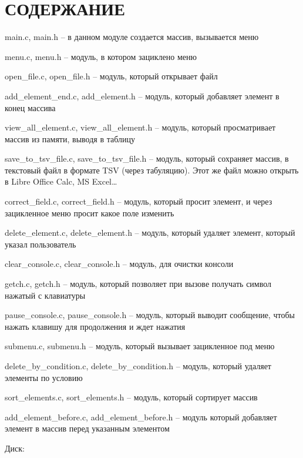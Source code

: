 \section*{СОДЕРЖАНИЕ}

main.c, main.h – в данном модуле создается массив, вызывается меню

menu.c, menu.h – модуль, в котором зациклено меню

open\_file.c, open\_file.h – модуль, который открывает файл

add\_element\_end.c, add\_element.h – модуль, который добавляет элемент в конец массива 

view\_all\_element.c, view\_all\_element.h – модуль, который просматривает массив из памяти, выводя в таблицу

save\_to\_tsv\_file.c, save\_to\_tsv\_file.h – модуль, который сохраняет массив, в текстовый файл в формате TSV (через табуляцию). Этот же файл можно открыть в Libre Office Calc, MS Excel…

correct\_field.c, correct\_field.h – модуль, который просит элемент, и через зацикленное меню просит какое поле изменить

delete\_element.c, delete\_element.h – модуль, который удаляет элемент, который указал пользователь

clear\_console.c, clear\_console.h – модуль, для очистки консоли

getch.c, getch.h – модуль, который позволяет при вызове получать символ нажатый с клавиатуры

pause\_console.c, pause\_console.h – модуль, который выводит сообщение, чтобы нажать клавишу для продолжения и ждет нажатия

submenu.c, submenu.h – модуль, который вызывает зацикленное под меню

delete\_by\_condition.c, delete\_by\_condition.h – модуль, который удаляет элементы по условию

sort\_elements.c, sort\_elements.h – модуль, который сортирует массив

add\_element\_before.c, add\_element\_before.h – модуль который добавляет элемент в массив перед указанным элементом

\newpage

Диск: